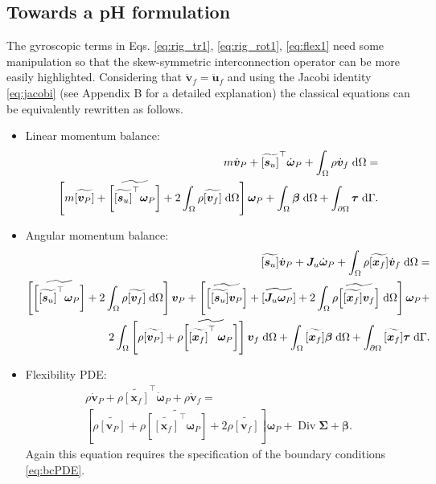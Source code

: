 \documentclass{svjour3}                     %
\DeclareMathOperator*{\Div}{Div}
\newcommand{\crmat}[1]{\ensuremath{\widetilde{\left[#1\right]}}}
\begin{document}
\subsection{Towards a pH formulation}
The gyroscopic terms in Eqs. \eqref{eq:rig_tr1}, \eqref{eq:rig_rot1}, \eqref{eq:flex1} need some manipulation so that the skew-symmetric interconnection operator can be more easily highlighted. Considering that $\dot{\bm{v}}_f = \ddot{\bm{u}}_f$ and using the Jacobi identity \eqref{eq:jacobi} (see Appendix B for a detailed explanation) the classical equations can be equivalently rewritten as follows. \\
\begin{itemize}
\item Linear momentum balance:
\begin{equation}
\label{eq:rig_tr2}
\begin{split}
m\dot{\bm{v}}_P + \crmat{\bm{s}_u}^\top \dot{\bm{\omega}}_P +   \int_{\Omega} \rho \dot{\bm{v}}_f \d{\Omega}  = \\
\left[m \crmat{\bm{v}_P} + \crmat{\crmat{\bm{s}_u}^\top \bm\omega_P} +2 \int_{\Omega} \rho \crmat{\bm{v}_f} \d{\Omega}\right] \bm\omega_P +  \int_{\Omega} \bm\beta \d{\Omega} + \int_{\partial \Omega} \bm\tau \d{\Gamma}.
\end{split}
\end{equation}
\item Angular momentum balance:
\begin{equation}
\label{eq:rig_rot2}
\begin{split}
\crmat{\bm{s}_u} \dot{\bm{v}}_P  + \bm{J}_u \dot{\bm\omega}_P + \int_{\Omega} \rho \crmat{\bm{x}_f} \dot{\bm{v}}_f \d{\Omega} = \\
\left[\crmat{\crmat{\bm{s}_u}^\top \bm\omega_P} + 2 \int_{\Omega} \rho \crmat{\bm{v}_f} \d{\Omega}\right] \bm{v}_P + \left[\crmat{\crmat{\bm{s}_u} \bm{v}_P} + \crmat{\bm{J}_u \bm\omega_P} + 2 \int_{\Omega} \rho \crmat{\crmat{\bm{x}_f} {\bm{v}}_f} \d{\Omega}\right] \bm\omega_P + 
\\
2 \int_{\Omega} \left[\rho \crmat{\bm{v}_P} + \rho \crmat{\crmat{\bm{x}_f}^\top \, \bm\omega_P}\right] \bm{v}_f \d{\Omega} + \int_{\Omega}\crmat{\bm{x}_f} \bm\beta \d{\Omega} + \int_{\partial \Omega}\crmat{\bm{x}_f} \bm{\tau} \d{\Gamma}.
\end{split}
\end{equation}
\item Flexibility PDE:
\begin{equation}
\label{eq:flex2}
\begin{split}
\rho \dot{\bm{v}}_P + \rho \crmat{\bm{x}_f}^\top \dot{\bm\omega}_P  + \rho \dot{\bm{v}}_f = \\
\left[\rho \crmat{\bm{v}_P} + \rho \crmat{\crmat{\bm{x}_f}^\top \bm\omega_P} + 2 \rho \crmat{\bm{v}_f}\right] \bm\omega_P + \Div{\bm\Sigma} + \bm\beta.
\end{split}
\end{equation}
Again this equation requires the specification of the boundary conditions \eqref{eq:bcPDE}.
\end{itemize}
\end{document}
